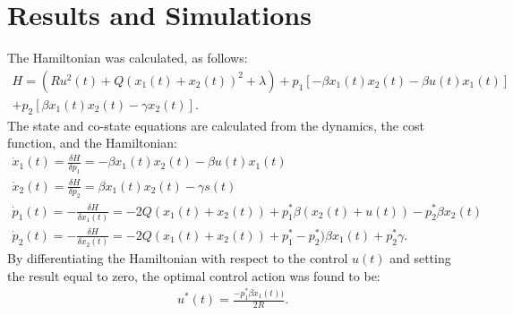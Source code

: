 \section{Results and Simulations}
The Hamiltonian was calculated, as follows:
\begin{equation}
\left.\begin{aligned}
H = (Ru^2(t)+Q(x_1(t)+x_2(t))^2 + \lambda ) +p_1[- \beta x_1(t)x_2(t) - \beta u(t)x_1(t)]\\ + p_2[\beta x_1(t)x_2(t) - \gamma x_2(t)].
\end{aligned}\right.
\end{equation}
The state and co-state equations are calculated from the dynamics, the cost function, and the Hamiltonian:
\begin{equation}
\left.\begin{aligned}
\dot{x}_1(t) = \frac{\delta H}{\delta p_1} = -\beta x_1(t)x_2(t) - \beta u(t)x_1(t)\\
\dot{x}_2(t) = \frac{\delta H}{\delta p_2} = \beta x_1(t)x_2(t) - \gamma s(t)\\
\dot{p}_1(t) = -\frac{\delta H}{\delta x_1(t)} = -2Q(x_1(t)+x_2(t)) + p^*_1 \beta (x_2(t)+u(t)) - p^*_2 \beta x_2(t)\\
\dot{p}_2(t) = -\frac{\delta H}{\delta x_2(t)} = -2Q(x_1(t)+x_2(t)) + p^*_1- p^*_2) \beta x_1(t) + p^*_2 \gamma.
\end{aligned}\right.
\end{equation}
By differentiating the Hamiltonian with respect to the control $u(t)$ and setting the result equal to zero, the optimal control action was found to be:
\begin{equation}
\left.\begin{aligned}
u^*(t) = \frac{-p^*_1 \beta x_1(t))}{2R}.
\end{aligned}\right.
\end{equation}

